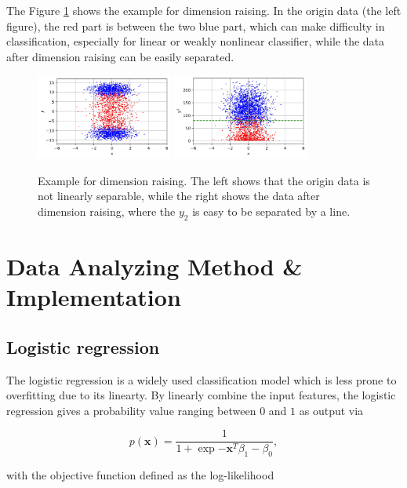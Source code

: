 \documentclass[11pt]{article}
\begin{document}
The Figure \ref{sample-raising} shows the example for dimension raising. In the origin data (the left figure), the red part is between the two blue part, which can make difficulty in classification, especially for linear or weakly nonlinear classifier, while the data after dimension raising can be easily separated.

\begin{figure}[H]
  \centering
  \includegraphics[width=0.4\textwidth]{./figure/Sample-Raising-1.jpg}
  \includegraphics[width=0.4\textwidth]{./figure/Sample-Raising-2.jpg}
  \caption{Example for dimension raising. The left shows that the origin data is not linearly separable, while the right shows the data after dimension raising, where the $y_2$ is easy to be separated by a line.}
  \label{sample-raising}
\end{figure}

\section{Data Analyzing Method \& Implementation}

\subsection{Logistic regression}

The logistic regression \cite{walker1967estimation} \cite{pohar2004comparison} is a widely used classification model which is less prone to overfitting due to its linearty. By linearly combine the input features, the logistic regression gives a probability value ranging between $0$ and $1$ as output via

$$
  p (\mathbf{x}) = \frac{1}{1 + \exp{- \mathbf{x}^T \beta_1 - \beta_0}},
$$

\noindent with the objective function defined as the log-likelihood
\end{document}
